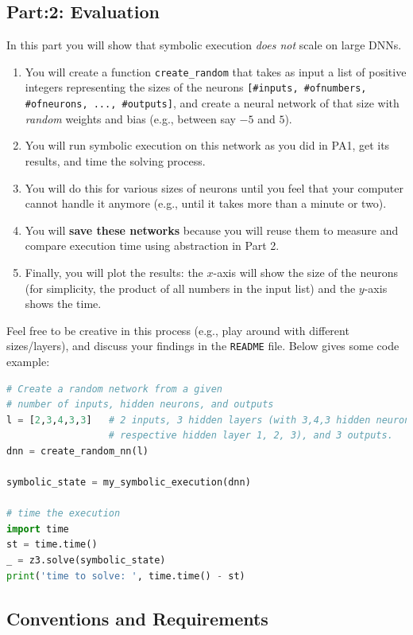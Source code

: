 \documentclass[oneside,11pt,dvipsnames]{book}
\numberwithin{equation}{section}
\theoremstyle{definition}
\theoremstyle{remark}
\begin{document}
\subsection{Part:2: Evaluation}
In this part you will show that symbolic execution \emph{does not} scale on large DNNs.

\begin{enumerate}
    \item You will create a function \texttt{create\_random} that takes as input a list of positive integers representing the sizes of the neurons \texttt{[\#inputs, \#ofnumbers, \#ofneurons, ..., \#outputs]}, and create a neural network of that size with \emph{random} weights and bias (e.g., between say $-5$ and $5$).
    \item You will run symbolic execution on this network as you did in PA1, get its results, and time the solving process.
    \item You will do this for various sizes of neurons until you feel that your computer cannot handle it anymore (e.g., until it takes more than a minute or two).
    \item You will \textbf{save these networks} because you will reuse them to measure and compare execution time using abstraction in Part 2.
    \item Finally, you will plot the results: the $x$-axis will show the size of the neurons (for simplicity, the product of all numbers in the input list) and the $y$-axis shows the time.
\end{enumerate}

Feel free to be creative in this process (e.g., play around with different sizes/layers), and discuss your findings in the \texttt{README} file. Below gives some code example:

\begin{lstlisting}[language=Python]
# Create a random network from a given 
# number of inputs, hidden neurons, and outputs
l = [2,3,4,3,3]   # 2 inputs, 3 hidden layers (with 3,4,3 hidden neurons for 
                  # respective hidden layer 1, 2, 3), and 3 outputs.
dnn = create_random_nn(l)

symbolic_state = my_symbolic_execution(dnn)

# time the execution
import time
st = time.time()
_ = z3.solve(symbolic_state)
print('time to solve: ', time.time() - st)
\end{lstlisting}

\subsection{Conventions and Requirements}
\end{document}
